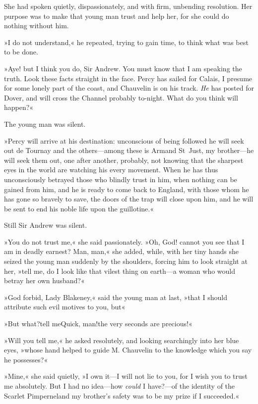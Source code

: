 She had spoken quietly, dispassionately, and with firm, unbending resolution. Her purpose was to make that young man trust and help her, for she could do nothing without him.

»I do not understand,« he repeated, trying to gain time, to think what was best to be done.

»Aye! but I think you do, Sir Andrew. You must know that I am speaking the truth. Look these facts straight in the face. Percy has sailed for Calais, I presume for some lonely part of the coast, and Chauvelin is on his track. \textit{He} has posted for Dover, and will cross the Channel probably to-night. What do you think will happen?«

The young man was silent.

»Percy will arrive at his destination: unconscious of being followed he will seek out de Tournay and the others—among these is Armand St~Just, my brother—he will seek them out, one after another, probably, not knowing that the sharpest eyes in the world are watching his every movement. When he has thus unconsciously betrayed those who blindly trust in him, when nothing can be gained from him, and he is ready to come back to England, with those whom he has gone so bravely to save, the doors of the trap will close upon him, and he will be sent to end his noble life upon the guillotine.«

Still Sir Andrew was silent.

»You do not trust me,« she said passionately. »Oh, God! cannot you see that I am in deadly earnest? Man, man,« she added, while, with her tiny hands she seized the young man suddenly by the shoulders, forcing him to look straight at her, »tell me, do I look like that vilest thing on earth—a woman who would betray her own husband?«

»God forbid, Lady Blakeney,« said the young man at last, »that I should attribute such evil motives to you, but\textellipsis«

»But what?\textellipsis \allowbreak  tell me\textellipsis \allowbreak  Quick, man!\textellipsis \allowbreak  the very seconds are precious!«

»Will you tell me,« he asked resolutely, and looking searchingly into her blue eyes, »whose hand helped to guide M. Chauvelin to the knowledge which you say he possesses?«

»Mine,« she said quietly, »I own it—I will not lie to you, for I wish you to trust me absolutely. But I had no idea—how \textit{could} I have?—of the identity of the Scarlet Pimpernel\textellipsis \allowbreak  and my brother's safety was to be my prize if I succeeded.«

